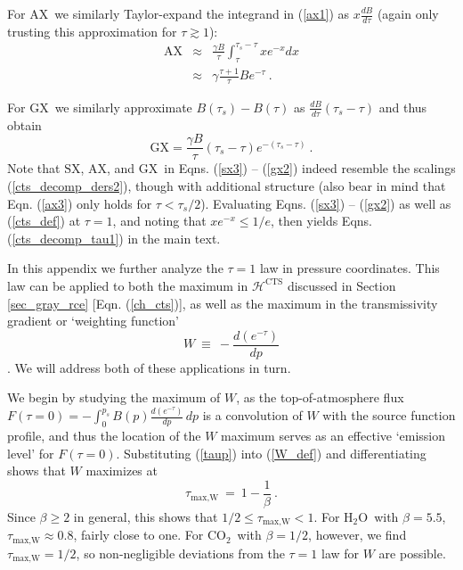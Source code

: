 \documentclass{ametsoc}
\newcommand{\beqn}{\begin{equation}}
\newcommand{\eeqn}{\end{equation}}
\newcommand{\beqa}{\begin{eqnarray}}
\newcommand{\eeqa}{\end{eqnarray}}
\newcommand{\n}{\nonumber}
\newcommand{\eqnref}[1]{(\ref{#1})}
\newcommand{\der}[2]{\ensuremath{\frac{d #1}{d #2}}}
\newcommand{\ps}{\ensuremath{p_s}}
\newcommand{\cotwo}{\ensuremath{\mathrm{CO_2}}}
\newcommand{\htwo}{\ensuremath{\mathrm{H_2O}}}
\newcommand{\ch}{\ensuremath{\mathcal{H}}}
\newcommand{\taus}{\ensuremath{\tau_s}}
\newcommand{\taumaxw}{\ensuremath{\tau_{\text{max,W}}}}
\newcommand{\SX}{\ensuremath{\mathrm{SX}}}
\newcommand{\AX}{\ensuremath{\mathrm{AX}}}
\newcommand{\GX}{\ensuremath{\mathrm{GX}}}
\newcommand{\CTS}{\ensuremath{\mathrm{CTS}}}
\begin{document}
 For \AX\ we similarly Taylor-expand the integrand in \eqnref{ax1} as $x\frac{d B}{d \tau}$ (again only trusting this approximation for  $\tau \gtrsim 1$):
\beqa
 	\AX &  \approx  &    \frac{\gamma B}{ \tau} \int_\tau^{\taus - \tau} x e^{-x} dx \n 	  \\
		   &  \approx  & \gamma \frac{\tau+1}{\tau}B e^{-\tau}  \ . \label{ax3} 
\eeqa

For \GX\  we similarly approximate $B(\taus) - B(\tau)$ as $\der{B}{\tau} (\taus-\tau)$ and thus obtain
\beqn
	\GX  =    \frac{\gamma B}{\tau}(\taus-\tau)e^{-(\taus-\tau)}  \ .
	\label{gx2}
\eeqn
Note that \SX, \AX, and \GX\  in  Eqns. \eqnref{sx3} -- \eqnref{gx2} indeed resemble the scalings \eqnref{cts_decomp_ders2}, though with additional structure (also bear in mind that Eqn. \eqnref{ax3} only holds for $\tau < \taus/2$).  Evaluating Eqns. \eqnref{sx3} -- \eqnref{gx2} as well as  \eqnref{cts_def} at $\tau=1$, and noting that $xe^{-x}\leq 1/e$, then yields Eqns. \eqnref{cts_decomp_tau1} in the main text.


\appendix[B]
\label{appendix_tau1}
In this appendix we further analyze the $\tau=1$ law in pressure coordinates. This law can be applied to both the maximum in $\ch^{\CTS}$  discussed in Section \ref{sec_gray_rce} [Eqn. \eqnref{ch_cts}], as well as the maximum in the transmissivity gradient or `weighting function' 
\beqn
	W\ \equiv \ - \der{(e^{-\tau})}{p}
\label{W_def}
\eeqn
 \citep[e.g.][]{wallace2006,petty2006}. We will address both of these applications in turn. 

We begin by studying the maximum of $W$, as the top-of-atmosphere flux $F(\tau=0)=-\int_0^{\ps} B(p)\der{(e^{-\tau})}{p}\, dp$ is a convolution of $W$ with the source function profile, and thus the location of the $W$ maximum serves as an effective `emission level' for $F(\tau=0)$. Substituting \eqnref{taup} into \eqnref{W_def} and differentiating shows that $W$ maximizes at
\beqn
	\taumaxw \ = \ 1 - \frac{1}{\beta}  \ .
	\label{taumaxw}
\eeqn
Since $\beta \geq 2 $ in general, this shows that $1/2 \leq \taumaxw  < 1$. For \htwo\ with $\beta = 5.5$, $\taumaxw \approx 0.8$, fairly close to one. For \cotwo\ with $\beta = 1/2$, however, we find $\taumaxw = 1/2$, so non-negligible deviations from the $\tau=1$ law for $W$ are possible.
\end{document}

